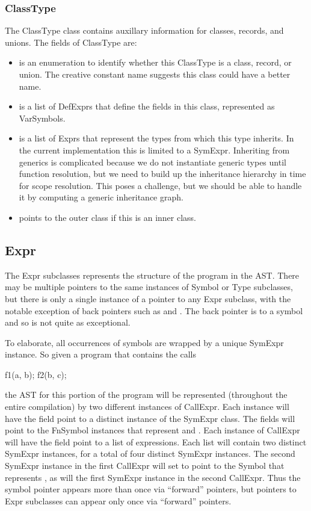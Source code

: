 \documentclass[10pt]{article}
\begin{document}
\subsubsection{ClassType}
\label{sec:classtype}

The ClassType class contains auxillary information for classes,
records, and unions.  The fields of ClassType are:
\begin{itemize}
\item {} is an enumeration to identify whether
  this ClassType is a class, record, or union.  The creative constant
  name  suggests this class could have a better name.
\item {} is a list of DefExprs that define the fields
  in this class, represented as VarSymbols.
\item {} is a list of Exprs that represent the types
  from which this type inherits.  In the current implementation this
  is limited to a SymExpr.  Inheriting from generics is complicated
  because we do not instantiate generic types until function
  resolution, but we need to build up the inheritance hierarchy in
  time for scope resolution.  This poses a challenge, but we should be
  able to handle it by computing a generic inheritance graph.
\item {} points to the outer class if this is an inner
  class.
\end{itemize}

\subsection{Expr}

The Expr subclasses represents the structure of the program in the
AST.  There may be multiple pointers to the same instances of Symbol
or Type subclasses, but there is only a single instance of a pointer
to any Expr subclass, with the notable exception of back pointers such
as  and .  The back pointer
 is to a symbol and so is not quite as exceptional.

To elaborate, all occurrences of symbols are wrapped by a unique
SymExpr instance.  So given a program that contains the calls
\begin{chapel}
f1(a, b);
f2(b, c);
\end{chapel}
the AST for this portion of the program will be represented
(throughout the entire compilation) by two different instances of
CallExpr.  Each instance will have the  field point to a
distinct instance of the SymExpr class.  The  fields will
point to the FnSymbol instances that represent  and
.  Each instance of CallExpr will have the  field
point to a list of expressions.  Each list will contain two distinct
SymExpr instances, for a total of four distinct SymExpr instances.
The second SymExpr instance in the first CallExpr will set  to
point to the Symbol that represents , as will the first
SymExpr instance in the second CallExpr.  Thus the symbol pointer
appears more than once via ``forward'' pointers, but pointers to Expr
subclasses can appear only once via ``forward'' pointers.
\end{document}
